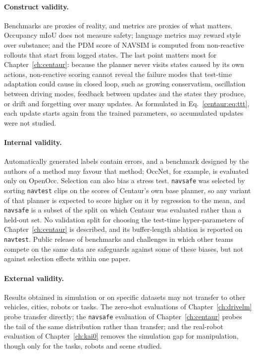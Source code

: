 \paragraph{Construct validity.} Benchmarks are proxies of reality, and metrics are proxies of what matters. Occupancy mIoU does not measure safety; language metrics may reward style over substance; and the PDM score of NAVSIM is computed from non-reactive rollouts that start from logged states. The last point matters most for Chapter~\ref{ch:centaur}: because the planner never visits states caused by its own actions, non-reactive scoring cannot reveal the failure modes that test-time adaptation could cause in closed loop, such as growing conservatism, oscillation between driving modes, feedback between updates and the states they produce, or drift and forgetting over many updates. As formulated in Eq.~\eqref{centaur:eq:ttt}, each update starts again from the trained parameters, so accumulated updates were not studied.

\paragraph{Internal validity.} Automatically generated labels contain errors, and a benchmark designed by the authors of a method may favour that method; OccNet, for example, is evaluated only on OpenOcc. Selection can also bias a stress test. \texttt{navsafe} was selected by sorting \texttt{navtest} clips on the scores of Centaur's own base planner, so any variant of that planner is expected to score higher on it by regression to the mean, and \texttt{navsafe} is a subset of the split on which Centaur was evaluated rather than a held-out set. No validation split for choosing the test-time hyper-parameters of Chapter~\ref{ch:centaur} is described, and its buffer-length ablation is reported on \texttt{navtest}. Public release of benchmarks and challenges in which other teams compete on the same data are safeguards against some of these biases, but not against selection effects within one paper.

\paragraph{External validity.} Results obtained in simulation or on specific datasets may not transfer to other vehicles, cities, robots or tasks. The zero-shot evaluations of Chapter~\ref{ch:drivelm} probe transfer directly; the \texttt{navsafe} evaluation of Chapter~\ref{ch:centaur} probes the tail of the same distribution rather than transfer; and the real-robot evaluation of Chapter~\ref{ch:kai0} removes the simulation gap for manipulation, though only for the tasks, robots and scene studied.

